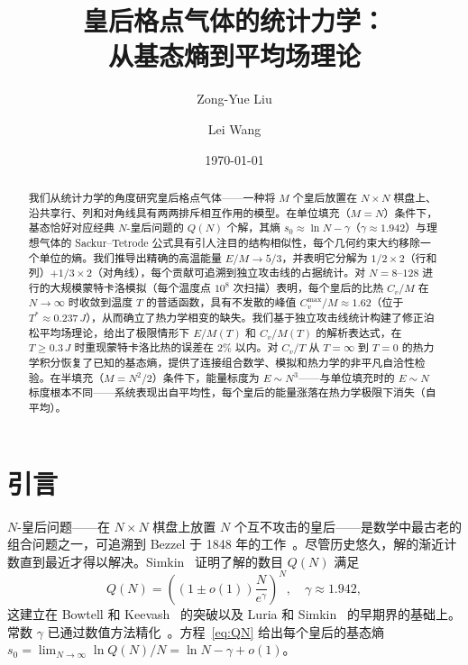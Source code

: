 \documentclass[aps, pre, reprint, amsmath, amssymb, superscriptaddress, floatfix]{revtex4-2}
\begin{document}
\title{皇后格点气体的统计力学：\\
从基态熵到平均场理论}

\author{Zong-Yue Liu}

\author{Lei Wang}

\date{\today}

\begin{abstract}
我们从统计力学的角度研究皇后格点气体——一种将 $M$ 个皇后放置在 $N \times N$ 棋盘上、沿共享行、列和对角线具有两两排斥相互作用的模型。在单位填充（$M = N$）条件下，基态恰好对应经典 $N$-皇后问题的 $Q(N)$ 个解，其熵 $s_0 \approx \ln N - \gamma$（$\gamma \approx 1.942$）与理想气体的 Sackur--Tetrode 公式具有引人注目的结构相似性，每个几何约束大约移除一个单位的熵。我们推导出精确的高温能量 $E/M \to 5/3$，并表明它分解为 $1/2 \times 2$（行和列）$+ 1/3 \times 2$（对角线），每个贡献可追溯到独立攻击线的占据统计。对 $N = 8$--$128$ 进行的大规模蒙特卡洛模拟（每个温度点 $10^8$ 次扫描）表明，每个皇后的比热 $C_v/M$ 在 $N \to \infty$ 时收敛到温度 $T$ 的普适函数，具有不发散的峰值 $C_v^{\max}/M \approx 1.62$（位于 $T^* \approx 0.237\,J$），从而确立了热力学相变的缺失。我们基于独立攻击线统计构建了修正泊松平均场理论，给出了极限情形下 $E/M(T)$ 和 $C_v/M(T)$ 的解析表达式，在 $T \ge 0.3\,J$ 时重现蒙特卡洛比热的误差在 $2\%$ 以内。对 $C_v/T$ 从 $T = \infty$ 到 $T = 0$ 的热力学积分恢复了已知的基态熵，提供了连接组合数学、模拟和热力学的非平凡自洽性检验。在半填充（$M = N^2/2$）条件下，能量标度为 $E \sim N^3$——与单位填充时的 $E \sim N$ 标度根本不同——系统表现出自平均性，每个皇后的能量涨落在热力学极限下消失（自平均）。
\end{abstract}

\maketitle

\section{引言}
\label{sec:intro}

$N$-皇后问题——在 $N \times N$ 棋盘上放置 $N$ 个互不攻击的皇后——是数学中最古老的组合问题之一，可追溯到 Bezzel 于 1848 年的工作~\cite{Bezzel1848}。尽管历史悠久，解的渐近计数直到最近才得以解决。Simkin~\cite{Simkin2022} 证明了解的数目 $Q(N)$ 满足
\begin{equation}
  Q(N) = \left((1 \pm o(1))\frac{N}{e^{\gamma}} \right)^N, \quad
  \gamma \approx 1.942,
  \label{eq:QN}
\end{equation}
这建立在 Bowtell 和 Keevash~\cite{Bowtell2023} 的突破以及 Luria 和 Simkin~\cite{Luria2021} 的早期界的基础上。常数 $\gamma$ 已通过数值方法精化~\cite{Nobel2023}。方程~\eqref{eq:QN} 给出每个皇后的基态熵
$s_0 = \lim_{N \to \infty} \ln Q(N)/N = \ln N - \gamma + o(1)$。
\end{document}
